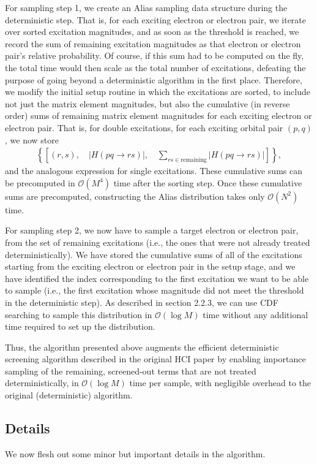 \documentclass[english]{article}
\begin{document}
For sampling step 1, we create an Alias sampling data structure during the deterministic step. That is, for each exciting electron or electron pair, we iterate over sorted excitation magnitudes, and as soon as the threshold is reached, we record the sum of remaining excitation magnitudes as that electron or electron pair's relative probability. Of course, if this sum had to be computed on the fly, the total time would then scale as the total number of excitations, defeating the purpose of going beyond a deterministic algorithm in the first place. Therefore, we modify the initial setup routine in which the excitations are sorted, to include not just the matrix element magnitudes, but also the cumulative (in reverse order) sums of remaining matrix element magnitudes for each exciting electron or electron pair. That is, for double excitations, for each exciting orbital pair $(p,q)$, we now store
\begin{eqnarray}
	\left\{\left[(r,s), \quad |H(pq\rightarrow rs)|, \quad \sum_{rs\in\textrm{remaining}}|H(pq\rightarrow rs)|\right]\right\},
\end{eqnarray}
and the analogous expression for single excitations. These cumulative sums can be precomputed in $\mathcal{O}(M^4)$ time after the sorting step. Once these cumulative sums are precomputed, constructing the Alias distribution takes only $\mathcal{O}(N^2)$ time.

For sampling step 2, we now have to sample a target electron or electron pair, from the set of remaining excitations (i.e., the ones that were not already treated deterministically). We have stored the cumulative sums of all of the excitations starting from the exciting electron or electron pair in the setup stage, and we have identified the index corresponding to the first excitation we want to be able to sample (i.e., the first excitation whose magnitude did not meet the threshold in the deterministic step). As described in section 2.2.3, we can use CDF searching to sample this distribution in $\mathcal{O}(\log M)$ time without any additional time required to set up the distribution.

Thus, the algorithm presented above augments the efficient deterministic screening algorithm described in the original HCI paper by enabling importance sampling of the remaining, screened-out terms that are not treated deterministically, in $\mathcal{O}(\log M)$ time per sample, with negligible overhead to the original (deterministic) algorithm.

\subsection{Details}
We now flesh out some minor but important details in the algorithm.
\end{document}
